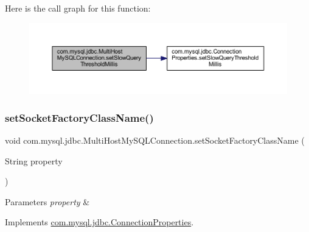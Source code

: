 Here is the call graph for this function\+:
\nopagebreak
\begin{figure}[H]
\begin{center}
\leavevmode
\includegraphics[width=350pt]{classcom_1_1mysql_1_1jdbc_1_1_multi_host_my_s_q_l_connection_a0b2593b4f94be127319ff6d487f5edcc_cgraph}
\end{center}
\end{figure}
\mbox{\label{classcom_1_1mysql_1_1jdbc_1_1_multi_host_my_s_q_l_connection_a24d505e2b23813fa2186aae41633b5de}} 
\subsubsection{\texorpdfstring{set\+Socket\+Factory\+Class\+Name()}{setSocketFactoryClassName()}}
{\footnotesize\ttfamily void com.\+mysql.\+jdbc.\+Multi\+Host\+My\+S\+Q\+L\+Connection.\+set\+Socket\+Factory\+Class\+Name (\begin{DoxyParamCaption}\item[{String}]{property }\end{DoxyParamCaption})}


\begin{DoxyParams}{Parameters}
{\em property} & \\
\hline
\end{DoxyParams}


Implements \mbox{\hyperlink{interfacecom_1_1mysql_1_1jdbc_1_1_connection_properties_ab0f719c12e2d1fe7fe6dd180e8c7a825}{com.\+mysql.\+jdbc.\+Connection\+Properties}}.

